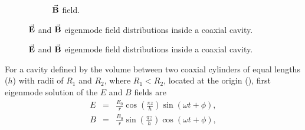 \documentclass[a4paper,oneside,12pt]{report}
\numberwithin{equation}{chapter}
\begin{document}
\begin{figure}[H]
\begin{subfigure}{0.45\textwidth}
        \caption*{$\vec{\textbf{B}}$ field.}
    \end{subfigure}
    \caption{$\vec{\textbf{E}}$ and $\vec{\textbf{B}}$ eigenmode field distributions inside a coaxial cavity.}
    \label{fig:rhodo_cavity_field_dist}
\end{figure} \fi
\vspace{22pt}
\begin{figure}[H]
    \centering
    \qquad{}%
    \vspace{4pt}
    \caption{$\vec{\textbf{E}}$ and $\vec{\textbf{B}}$ eigenmode field distributions inside a coaxial cavity.}
    \label{fig:rhodo_cavity_field_dist}
\end{figure}
\vspace{-15pt}
For a cavity defined by the volume between two coaxial cylinders of equal lengths ($h$) with radii of $R_1$ and $R_2$, where $R_1 < R_2$, located at the origin (),
first eigenmode solution of the $E$ and $B$ fields are \cite{rhodo_pottier}
\vspace{-12pt}
\begin{eqnarray}
    E &=& \frac{E_0}{r} \cos\left( \frac{\pi z}{h} \right) \sin \left( \omega t + \phi \right)  , \\
    B &=& \frac{B_0}{r} \sin\left( \frac{\pi z}{h}\right) \cos\left( \omega t + \phi\right)  ,
\end{eqnarray}
\end{document}
